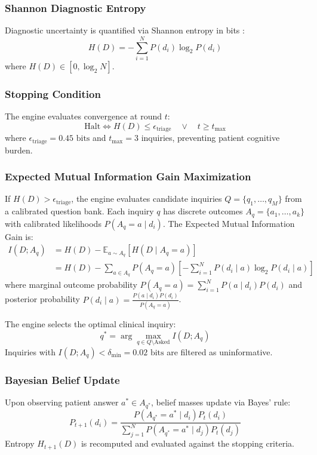 \documentclass[10pt,twocolumn]{article}
\begin{document}
\subsubsection{Shannon Diagnostic Entropy}
Diagnostic uncertainty is quantified via Shannon entropy in bits \cite{shannon1948mathematical}:
\begin{equation}
H(D) = -\sum_{i=1}^N P(d_i) \log_2 P(d_i)
\end{equation}
where $H(D) \in [0, \log_2 N]$.

\subsubsection{Stopping Condition}
The engine evaluates convergence at round $t$:
\begin{equation}
\text{Halt} \iff H(D) \le \epsilon_{\text{triage}} \quad \lor \quad t \ge t_{\max}
\end{equation}
where $\epsilon_{\text{triage}} = 0.45\text{ bits}$ and $t_{\max} = 3$ inquiries, preventing patient cognitive burden.

\subsubsection{Expected Mutual Information Gain Maximization}
If $H(D) > \epsilon_{\text{triage}}$, the engine evaluates candidate inquiries $Q = \{q_1, \dots, q_M\}$ from a calibrated question bank. Each inquiry $q$ has discrete outcomes $A_q = \{a_1, \dots, a_k\}$ with calibrated likelihoods $P(A_q = a \mid d_i)$. The Expected Mutual Information Gain is:
\begin{align}
I(D; A_q) &= H(D) - \mathbb{E}_{a \sim A_q}[H(D \mid A_q = a)] \nonumber \\
&= H(D) - \sum_{a \in A_q} P(A_q = a) \left[ -\sum_{i=1}^N P(d_i \mid a) \log_2 P(d_i \mid a) \right]
\end{align}
where marginal outcome probability $P(A_q = a) = \sum_{i=1}^N P(a \mid d_i) P(d_i)$ and posterior probability $P(d_i \mid a) = \frac{P(a \mid d_i) P(d_i)}{P(A_q = a)}$.

The engine selects the optimal clinical inquiry:
\begin{equation}
q^* = \arg\max_{q \in Q \setminus \text{Asked}} I(D; A_q)
\end{equation}
Inquiries with $I(D; A_q) < \delta_{\min} = 0.02\text{ bits}$ are filtered as uninformative.

\subsubsection{Bayesian Belief Update}
Upon observing patient answer $a^* \in A_{q^*}$, belief masses update via Bayes' rule:
\begin{equation}
P_{t+1}(d_i) = \frac{P(A_{q^*} = a^* \mid d_i) P_t(d_i)}{\sum_{j=1}^N P(A_{q^*} = a^* \mid d_j) P_t(d_j)}
\end{equation}
Entropy $H_{t+1}(D)$ is recomputed and evaluated against the stopping criteria.
\end{document}
